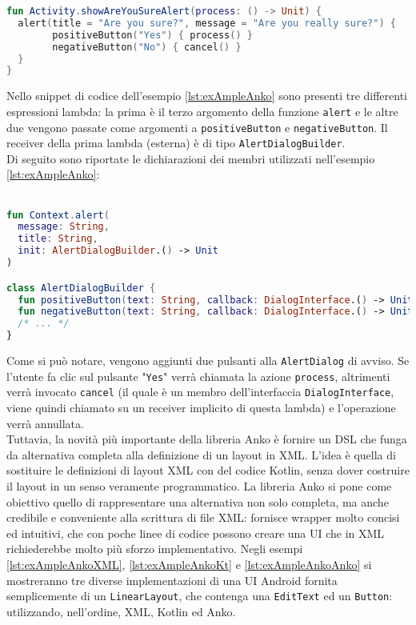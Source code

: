 \begin{lstlisting}[caption={Utilizzo di Anko per costruire un \texttt{AlertDialog}}, captionpos=b, label={lst:exAmpleAnko}, language=Kotlin]
fun Activity.showAreYouSureAlert(process: () -> Unit) {
  alert(title = "Are you sure?", message = "Are you really sure?") {
      	positiveButton("Yes") { process() }
      	negativeButton("No") { cancel() }
  }
}
\end{lstlisting}
Nello snippet di codice dell'esempio \ref{lst:exAmpleAnko} sono presenti tre differenti espressioni lambda: la prima è il terzo argomento della funzione \texttt{alert} e le altre due vengono passate come argomenti a \texttt{positiveButton} e \texttt{negativeButton}. Il receiver della prima lambda (esterna) è di tipo \texttt{AlertDialogBuilder}.\\
Di seguito sono riportate le dichiarazioni dei membri utilizzati nell'esempio \ref{lst:exAmpleAnko}:\\
\\

\begin{lstlisting}[caption={Definizione di funzioni di libreria Anko}, captionpos=b, label={lst:exAmpleAnkoDef}, language=Kotlin]
fun Context.alert(
  message: String,
  title: String,
  init: AlertDialogBuilder.() -> Unit
)

class AlertDialogBuilder {
  fun positiveButton(text: String, callback: DialogInterface.() -> Unit)
  fun negativeButton(text: String, callback: DialogInterface.() -> Unit)
  /* ... */
}
\end{lstlisting}

Come si può notare, vengono aggiunti due pulsanti alla \texttt{AlertDialog} di avviso. Se l'utente fa clic sul pulsante "\texttt{Yes}" verrà chiamata la azione \texttt{process}, altrimenti verrà invocato \texttt{cancel} (il quale è un membro dell'interfaccia \texttt{DialogInterface}, viene quindi chiamato su un receiver implicito di questa lambda) e l'operazione verrà annullata.\\
Tuttavia, la novità più importante della libreria Anko è fornire un DSL che funga da alternativa completa alla definizione di un layout in XML. L'idea è quella di sostituire le definizioni di layout XML con del codice Kotlin, senza dover costruire il layout in un senso veramente programmatico. La libreria Anko si pone come obiettivo quello di rappresentare una alternativa non solo completa, ma anche credibile e conveniente alla scrittura di file XML: fornisce wrapper molto concisi ed intuitivi, che con poche linee di codice possono creare una UI che in XML richiederebbe molto più sforzo implementativo. Negli esempi \ref{lst:exAmpleAnkoXML}, \ref{lst:exAmpleAnkoKt} e \ref{lst:exAmpleAnkoAnko} si mostreranno tre diverse implementazioni di una UI Android fornita semplicemente di un \texttt{LinearLayout}, che contenga una \texttt{EditText} ed un \texttt{Button}: utilizzando, nell'ordine, XML, Kotlin ed Anko.\\

